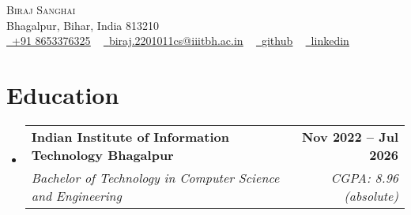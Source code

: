 \documentclass[letterpaper,11pt]{article}
\makeatletter
\newcommand{\resumeItem}[1]{
  \item\small{
    {#1 \vspace{-2pt}}
  }
}
\newcommand{\resumeSubheading}[4]{
  \vspace{-5pt}\item
    \begin{tabular*}{1.0\textwidth}[t]{l@{\extracolsep{\fill}}r}
      \textbf{#1} & \textbf{\small #2} \\
      \textit{\small#3} & \textit{\small #4} \\
    \end{tabular*}\vspace{-5pt}
}
\newcommand{\collegeItem}[1]{
    \item
    \begin{tabular*}{0.97\textwidth}{l@{\extracolsep{\fill}}r}
      \textit{\small#1} & \textit{\small } \\
    \end{tabular*}\vspace{-4pt}
}
\newcommand{\resumeSubHeadingListStart}{\begin{itemize}[leftmargin=0.0in, label={}]}
\newcommand{\resumeSubHeadingListEnd}{\end{itemize}}
\makeatother
\begin{document}

\begin{center}
    {\Huge \scshape Biraj Sanghai} \\ \vspace{1pt}
    Bhagalpur, Bihar, India 813210 \\ \vspace{1pt}
    \href{tel:918653376325}{\color{Blue} \raisebox{-0.2\height}\faPhone\
    \underline {+91 8653376325}} ~ \href{mailto:biraj.2201011cs@iiitbh.ac.in}{\color{Blue} \raisebox{-0.2\height}\faEnvelope\  \underline{biraj.2201011cs@iiitbh.ac.in}} ~ 
    \href{https://github.com/sanghaibiraj}{\color{Blue} \raisebox{-0.2\height}\faGithub\ \underline{github}} ~ 
    \href{https://www.linkedin.com/in/biraj-sanghai-iiitbh}{\color{Blue} \raisebox{-0.2\height}\faLinkedin\ \underline{linkedin}}
    \vspace{-8pt}
\end{center}


\section{Education}
  \resumeSubHeadingListStart
    \resumeSubheading
      {Indian Institute of Information Technology Bhagalpur}{Nov 2022 -- Jul 2026}
      {Bachelor of Technology in Computer Science and Engineering}{CGPA: 8.96 (absolute)}
  \resumeSubHeadingListEnd
  \vspace{-16pt}
  
\end{document}
